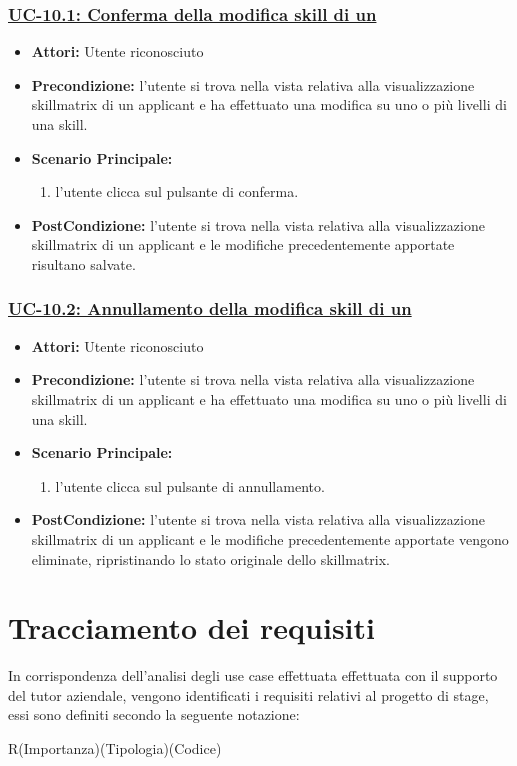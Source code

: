 \subsubsection{\underline{UC-10.1: Conferma della modifica skill di un \applicant}}
\begin{itemize}
	\item \textbf{Attori:} Utente riconosciuto
	\item \textbf{Precondizione:} l'utente si trova nella vista relativa alla visualizzazione skillmatrix di un applicant e ha effettuato una modifica su uno o più livelli di una skill.
	\item \textbf{Scenario Principale:}
	\begin{enumerate}
		\item l'utente clicca sul pulsante di conferma.
	\end{enumerate}
	\item \textbf{PostCondizione:} l'utente si trova nella vista relativa alla visualizzazione skillmatrix di un applicant e le modifiche precedentemente apportate risultano salvate.
\end{itemize}

\subsubsection{\underline{UC-10.2: Annullamento della modifica skill di un \applicant}}
\begin{itemize}
	\item \textbf{Attori:} Utente riconosciuto
	\item \textbf{Precondizione:} l'utente si trova nella vista relativa alla visualizzazione skillmatrix di un applicant e ha effettuato una modifica su uno o più livelli di una skill.
	\item \textbf{Scenario Principale:}
	\begin{enumerate}
		\item l'utente clicca sul pulsante di annullamento.
	\end{enumerate}
	\item \textbf{PostCondizione:} l'utente si trova nella vista relativa alla visualizzazione skillmatrix di un applicant e le modifiche precedentemente apportate vengono eliminate, ripristinando lo stato originale dello skillmatrix.
\end{itemize}

\section{Tracciamento dei requisiti}
In corrispondenza dell'analisi degli use case effettuata effettuata con il supporto del tutor aziendale, vengono identificati i requisiti relativi al progetto di stage, essi sono definiti secondo la seguente notazione:
\vspace{1em}
\begin{center}
	R(Importanza)(Tipologia)(Codice)
\end{center}

